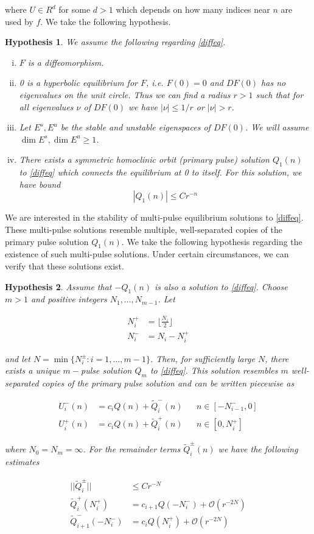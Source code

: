 \documentclass[12pt]{article}
\newtheorem{hypothesis}{Hypothesis}
\begin{document}
where $U \in R^d$ for some $d > 1$ which depends on how many indices near $n$ are used by $f$. We take the following hypothesis.

\begin{hypothesis}\label{initialhyp}
We assume the following regarding \eqref{diffeq}.
\begin{enumerate}[(i)]
\item $F$ is a diffeomorphism.
\item 0 is a hyperbolic equilibrium for $F$, i.e. $F(0) = 0$ and $DF(0)$ has no eigenvalues on the unit circle. Thus we can find a radius $r > 1$ such that for all eigenvalues $\nu$ of $DF(0)$ we have $|\nu| \leq 1/r$ or $|\nu| > r$.
\item Let $E^s, E^u$ be the stable and unstable eigenspaces of $DF(0)$. We will assume $\dim E^s, \dim E^u \geq 1$.
\item There exists a symmetric homoclinic orbit (primary pulse) solution $Q_1(n)$ to \eqref{diffeq} which connects the equilibrium at 0 to itself. For this solution, we have bound
\[
|Q_1(n)| \leq C r^{-n}
\]
\end{enumerate}
\end{hypothesis}

We are interested in the stability of multi-pulse equilibrium solutions to \eqref{diffeq}. These multi-pulse solutions resemble multiple, well-separated copies of the primary pulse solution $Q_1(n)$. We take the following hypothesis regarding the existence of such multi-pulse solutions. Under certain circumstances, we can verify that these solutions exist.

\begin{hypothesis}\label{multiexist}
Assume that $-Q_1(n)$ is also a solution to \eqref{diffeq}. Choose $m > 1$ and positive integers $N_1, \dots, N_{m-1}$. Let 

\begin{align*}
N_i^+ &= \lfloor \frac{N_i}{2} \rfloor \\
N_i^- &= N_i - N_i^+
\end{align*}

and let $N = \min\{ N_i^\pm : i = 1, \dots, m-1 \}$. Then, for sufficiently large $N$, there exists a unique $m-$pulse solution $Q_m$ to \eqref{diffeq}. This solution resembles $m$ well-separated copies of the primary pulse solution and can be written piecewise as 

\begin{align}
U_i^-(n) &= c_i Q(n) + \tilde{Q}_i^-(n) && n \in [-N_{i-1}^-, 0] \\
U_i^+(n) &= c_i Q(n) + \tilde{Q}_i^+(n) && n \in [0, N_i^+]
\end{align}

where $N_0 = N_m = \infty$. For the remainder terms $\tilde{Q}_i^\pm(n)$ we have the following estimates

\begin{align}
||\tilde{Q}_i^\pm|| &\leq C r^{-N} \\
\tilde{Q}_i^+(N_i^+) &= c_{i+1} Q(-N_i^-) + \mathcal{O}(r^{-2N}) \\
\tilde{Q}_{i+1}^-(-N_i^-) &= c_i Q(N_i^+) + \mathcal{O}(r^{-2N})
\end{align}
\end{hypothesis}
\end{document}
